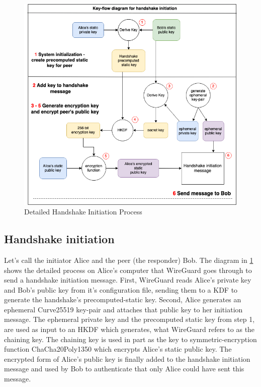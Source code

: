 \documentclass [11pt, proquest] {uwthesis}[2020/02/24]
\begin{document}
\begin{figure}[ht]
\includegraphics[width=15cm]{paper/images/key-flow-wg.drawio.png}
\caption{Detailed Handshake Initiation Process}
\label{fig:keyflow}
\end{figure}
\subsection{Handshake initiation}
\label{handinit}
Let's call the initiator Alice and the peer (the responder) Bob.
The diagram in \ref{fig:keyflow} shows the detailed process on Alice's computer that WireGuard goes through to send a handshake initiation message. First, WireGuard reads Alice's private key and Bob's public key from it's configuration file, sending them to a KDF to generate the handshake's precomputed-static key. Second, Alice generates an ephemeral Curve25519 key-pair and attaches that public key to her initiation message. The ephemeral private key and the precomputed static key from step 1, are used as input to an HKDF which generates, what WireGuard refers to as the chaining key. The chaining key is used in part as the key to symmetric-encryption function ChaCha20Poly1350 which encrypts Alice's static public key. The encrypted form of Alice's public key is finally added to the handshake initiation message and used by Bob to authenticate that only Alice could have sent this message.
\end{document}
